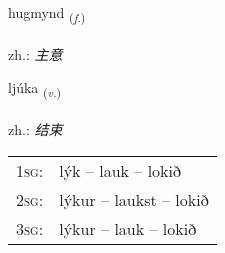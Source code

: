 \documentclass[frontgrid, backgrid]{flacards}\usepackage[]{graphicx}\usepackage[]{xcolor}
\begin{document}
\renewcommand{\blhead}{\vskip5pt {\small\bfseries\footnotesize Nafnorð | 名词 }}
\renewcommand{\bcfoot}{\vskip5pt \hspace{2pt}{\small\bfseries\footnotesize 1K}}


{hugmynd \small{\textsubscript{(\textit{f.})}} \\[1ex] %
\textphonetic{[hʏɣmɪnt]} \\
zh.: \emph{主意} \\  [2ex]
\renewcommand*{\arraystretch}{0.8}
}

\renewcommand{\flhead}{\vskip5pt \fboxsep=0pt {\small\bfseries\footnotesize Sagnorð | 动词}}
\renewcommand{\fcfoot}{\vskip5pt \fboxsep=0pt \hspace{2pt}{\small\bfseries\footnotesize 1K}}

\renewcommand{\blhead}{\vskip5pt {\small\bfseries\footnotesize Sagnorð | 动词 }}
\renewcommand{\bcfoot}{\vskip5pt \hspace{2pt}{\small\bfseries\footnotesize 1K}}


{ljúka \small{\textsubscript{(\textit{v.})}} \\[1ex] %
\textphonetic{[ljuːka]} \\
zh.: \emph{结束} \\  [2ex]
\renewcommand*{\arraystretch}{0.8}
\begin{tabular}{p{1cm}l}
\textsc{1sg}: & lýk -- lauk -- lokið \\ 
\textsc{2sg}: & lýkur -- laukst -- lokið \\ 
\textsc{3sg}: & lýkur -- lauk -- lokið \\ 
\end{tabular}
}

\renewcommand{\flhead}{\vskip5pt \fboxsep=0pt {\small\bfseries\footnotesize Nafnorð | 名词}}
\renewcommand{\fcfoot}{\vskip5pt \fboxsep=0pt \hspace{2pt}{\small\bfseries\footnotesize 1K}}
\end{document}
